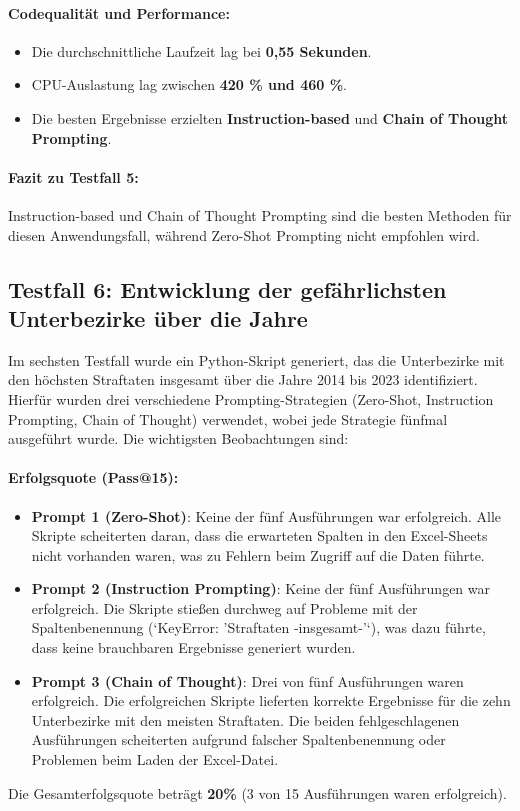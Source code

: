 \documentclass[11pt,a4paper]{article}
\begin{document}
\paragraph{Codequalität und Performance:}
\begin{itemize}
    \item Die durchschnittliche Laufzeit lag bei \textbf{0,55 Sekunden}.
    \item CPU-Auslastung lag zwischen \textbf{420 \% und 460 \%}.
    \item Die besten Ergebnisse erzielten \textbf{Instruction-based} und \textbf{Chain of Thought Prompting}.
\end{itemize}

\paragraph{Fazit zu Testfall 5:}
Instruction-based und Chain of Thought Prompting sind die besten Methoden für diesen Anwendungsfall, während Zero-Shot Prompting nicht empfohlen wird.

\subsection{Testfall 6: Entwicklung der gefährlichsten Unterbezirke über die Jahre}
\label{subsec:auswertung_testfall6}

Im sechsten Testfall wurde ein Python-Skript generiert, das die Unterbezirke mit den höchsten Straftaten insgesamt über die Jahre 2014 bis 2023 identifiziert. Hierfür wurden drei verschiedene Prompting-Strategien (Zero-Shot, Instruction Prompting, Chain of Thought) verwendet, wobei jede Strategie fünfmal ausgeführt wurde. Die wichtigsten Beobachtungen sind:

\paragraph{Erfolgsquote (Pass@15):}
\begin{itemize}
    \item \textbf{Prompt 1 (Zero-Shot)}: Keine der fünf Ausführungen war erfolgreich. Alle Skripte scheiterten daran, dass die erwarteten Spalten in den Excel-Sheets nicht vorhanden waren, was zu Fehlern beim Zugriff auf die Daten führte.
    \item \textbf{Prompt 2 (Instruction Prompting)}: Keine der fünf Ausführungen war erfolgreich. Die Skripte stießen durchweg auf Probleme mit der Spaltenbenennung (`KeyError: 'Straftaten -insgesamt-'`), was dazu führte, dass keine brauchbaren Ergebnisse generiert wurden.
    \item \textbf{Prompt 3 (Chain of Thought)}: Drei von fünf Ausführungen waren erfolgreich. Die erfolgreichen Skripte lieferten korrekte Ergebnisse für die zehn Unterbezirke mit den meisten Straftaten. Die beiden fehlgeschlagenen Ausführungen scheiterten aufgrund falscher Spaltenbenennung oder Problemen beim Laden der Excel-Datei.
\end{itemize}
Die Gesamterfolgsquote beträgt \textbf{20\%} (3 von 15 Ausführungen waren erfolgreich).
\end{document}
